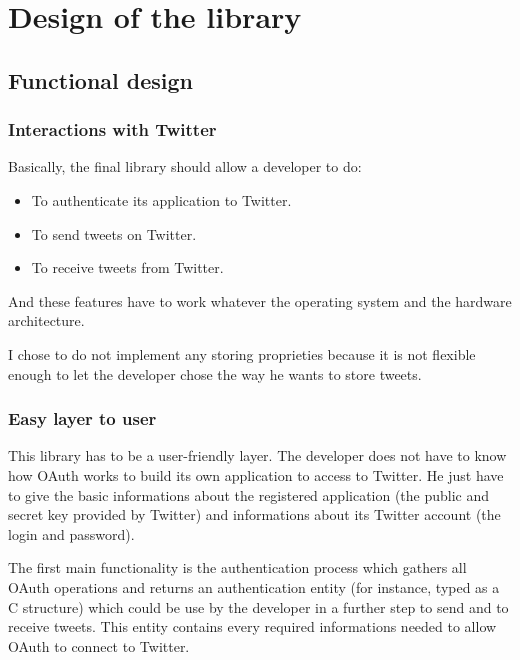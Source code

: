 \chapter{Design of the library}


\section{Functional design}

\subsection{Interactions with Twitter}

\hspace{15mm}Basically, the final library should allow a developer to do:
\begin{itemize}
\item To authenticate its application to Twitter. 
\item To send tweets on Twitter.
\item To receive tweets from Twitter.
\end{itemize}

And these features have to work whatever the operating system and the hardware architecture.

I chose to do not implement any storing proprieties because it is not flexible enough to let the developer chose the way he wants to store tweets.


\subsection{Easy layer to user}

\hspace{15mm}This library has to be a user-friendly layer. The developer does not have to know how OAuth works to build its own application to access to Twitter. He just have to give the basic informations about the registered application (the public and secret key provided by Twitter) and informations about its Twitter account (the login and password).

The first main functionality is the authentication process which gathers all OAuth operations and returns an authentication entity (for instance, typed as a C structure) which could be use by the developer in a further step to send and to receive tweets. This entity contains every required informations needed to allow OAuth to connect to Twitter. 

